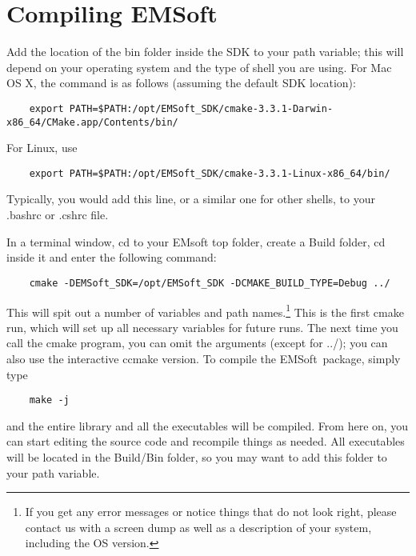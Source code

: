 \documentclass[DIV=calc, paper=letter, fontsize=11pt]{scrartcl}	 %
\newcommand{\ctp}{\textsf{EMSoft}}
\newcommand{\ctpb}{\textbf{\textsf{EMSoft}}}
\begin{document}
\section{Compiling \ctpb\label{sec:compile}}
Add the location of the bin folder inside the SDK to your path variable; this will depend on your operating system and the type 
of shell you are using.  For Mac OS X, the command is as follows (assuming the default SDK location):
\begin{verbatim}
	export PATH=$PATH:/opt/EMSoft_SDK/cmake-3.3.1-Darwin-x86_64/CMake.app/Contents/bin/
\end{verbatim}
For Linux, use
\begin{verbatim}
	export PATH=$PATH:/opt/EMSoft_SDK/cmake-3.3.1-Linux-x86_64/bin/
\end{verbatim}
Typically, you would add this line, or a similar one for other shells, to your \textsf{.bashrc} or \textsf{.cshrc} file.

In a terminal window, cd to your \textsf{EMsoft} top folder, create a \textsf{Build} folder, cd inside it and enter the following command:
\begin{verbatim}
	cmake -DEMSoft_SDK=/opt/EMSoft_SDK -DCMAKE_BUILD_TYPE=Debug ../
\end{verbatim}
This will spit out a number of variables and path names.\footnote{If you get any error messages or notice things that do not look right, please contact us with a 
screen dump as well as a description of your system, including the OS version.} This is the first cmake run, which will set up all necessary variables
for future runs.  The next time you call the cmake program, you can omit the arguments (except for ../); you can also use the interactive ccmake version.
To compile the \ctp\ package, simply type
\begin{verbatim}
	make -j
\end{verbatim}
and the entire library and all the executables will be compiled.  From here on, you can start editing the source code and recompile things as needed.
All executables will be located in the \textsf{Build/Bin} folder, so you may want to add this folder to your path variable.
\end{document}

